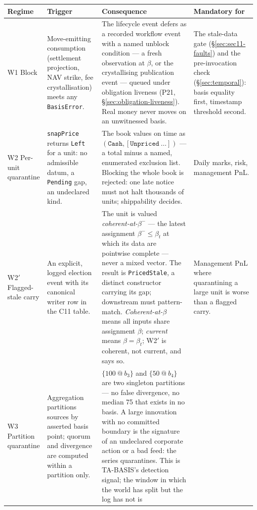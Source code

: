 \renewcommand{\arraystretch}{1.25}
\begin{center}
\begin{longtable}{@{}p{2.2cm} p{3.6cm} p{4.7cm} p{2.9cm}@{}}
\toprule
\textbf{Regime} & \textbf{Trigger} & \textbf{Consequence} & \textbf{Mandatory for} \\
\midrule
\endhead
W1 Block & Move-emitting consumption (settlement projection, NAV strike, fee
crystallisation) meets any \texttt{BasisError}. & The lifecycle event defers as a
recorded workflow event with a named unblock condition --- a fresh observation at
$\beta$, or the crystallising publication event --- queued under obligation liveness
(P21, \S\ref{sec:obligation-liveness}). Real money never moves on an unwitnessed basis.
& The stale-data gate (\S\ref{sec:sec11-faults}) and the pre-invocation check
(\S\ref{sec:temporal}): basis equality first, timestamp threshold second. \\
\addlinespace
W2 Per-unit quarantine & \texttt{snapPrice} returns \texttt{Left} for a unit: no
admissible datum, a \texttt{Pending} gap, an undeclared kind. & The book values on time
as $(\texttt{Cash},[\texttt{Unpriced}\ \dots])$ --- a total minus a named, enumerated
exclusion list. Blocking the whole book is rejected: one late notice must not halt
thousands of units; shippability decides. & Daily marks, risk, management PnL. \\
\addlinespace
W2$'$ Flagged-stale carry & An explicit, logged election event with its canonical
writer row in the C11 table. & The unit is valued \emph{coherent-at-}$\beta^-$ --- the
latest assignment $\beta^-\le\beta_t$ at which its data are pointwise complete --- never
a mixed vector. The result is \texttt{PricedStale}, a distinct constructor carrying its
gap; downstream must pattern-match. \emph{Coherent-at-}$\beta$ means all inputs share
assignment $\beta$; \emph{current} means $\beta=\beta_t$; W2$'$ is coherent, not
current, and says so. & Management PnL where quarantining a large unit is worse than a
flagged carry. \\
\addlinespace
W3 Partition quarantine & Aggregation partitions sources by asserted basis point;
quorum and divergence are computed within a partition only. & $\{100\ @\ b_3\}$ and
$\{50\ @\ b_4\}$ are two singleton partitions --- no false divergence, no median 75 that
exists in no basis. A large innovation with no committed boundary is the signature of an
undeclared corporate action or a bad feed: the series quarantines. This is TA-BASIS's
detection signal; the window in which the world has split but the log has not is

\end{longtable}
\end{center}
